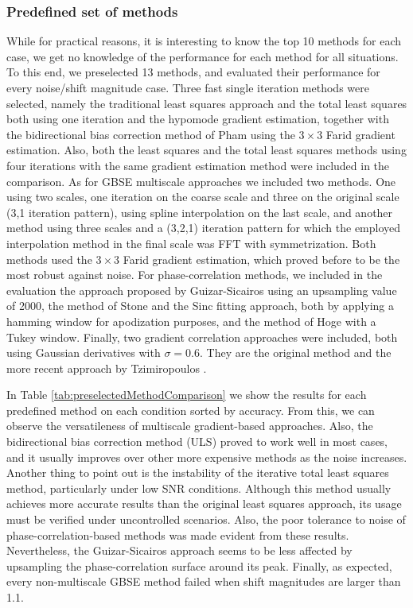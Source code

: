 \subsubsection{Predefined set of methods}
While for practical reasons, it is interesting to know the top 10 methods for each case, we get no knowledge of the performance for each method for all situations. To this end, we preselected 13 methods, and evaluated their performance for every noise/shift magnitude case. Three fast single iteration methods were selected, namely the traditional least squares approach and the total least squares both using one iteration and the hypomode gradient estimation, together with the bidirectional bias correction method of Pham \cite{pham2008} using the $3 \times 3$ Farid gradient estimation. Also, both the least squares and the total least squares methods using four iterations with the same gradient estimation method were included in the comparison. As for GBSE multiscale approaches we included two methods. One using two scales, one iteration on the coarse scale and three on the original scale (3,1 iteration pattern), using spline interpolation on the last scale, and another method using three scales and a (3,2,1) iteration pattern for which the employed interpolation method in the final scale was FFT with symmetrization. Both methods used the $3 \times 3$ Farid gradient estimation, which proved before to be the most robust against noise. For phase-correlation methods, we included in the evaluation the approach proposed by Guizar-Sicairos \cite{Guizar-Sicairos08} using an upsampling value of 2000, the method of Stone \cite{Stone_2001} and the Sinc fitting approach, both by applying a hamming window for apodization purposes, and the method of Hoge \cite{Hoge_2003}  with a Tukey window. Finally, two gradient correlation approaches were included, both using Gaussian derivatives with $\sigma=0.6$. They are the original method \cite{Argyriou2004} and the more recent approach by Tzimiropoulos \cite{Tzimiropoulos2011}.

In Table \ref{tab:preselectedMethodComparison} we show the results for each predefined method on each condition sorted by accuracy. From this, we can observe the versatileness of multiscale gradient-based approaches. Also, the bidirectional bias correction method (ULS) proved to work well in most cases, and it usually improves over other more expensive methods as the noise increases. Another thing to point out is the instability of the iterative total least squares method, particularly under low SNR conditions. Although this method usually achieves more accurate results than the original least squares approach, its usage must be verified \cite{Weber95robustcomputation, Tsai1998} under uncontrolled scenarios. Also, the poor tolerance to noise of phase-correlation-based methods was made evident from these results. Nevertheless, the Guizar-Sicairos approach seems to be less affected by upsampling the phase-correlation surface around its peak. Finally, as expected, every non-multiscale GBSE method failed when shift magnitudes are larger than 1.1.



